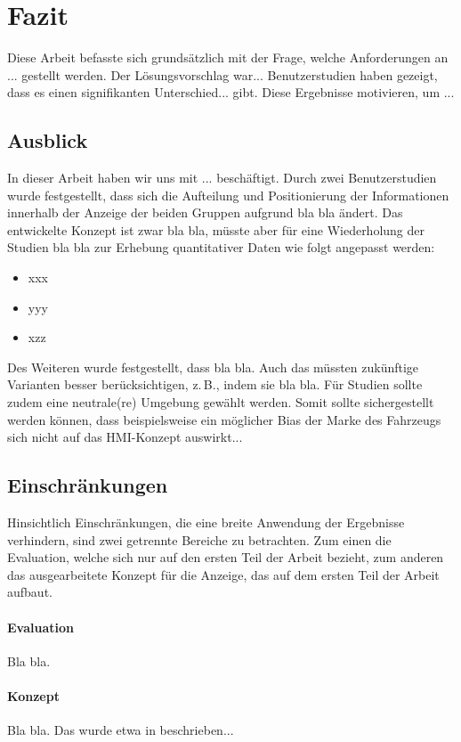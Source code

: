\section{Fazit}
Diese Arbeit befasste sich grundsätzlich mit der Frage, welche Anforderungen an ... gestellt werden.
Der Lösungsvorschlag war...
Benutzerstudien haben gezeigt, dass es einen signifikanten Unterschied... gibt. Diese Ergebnisse motivieren, um ...

\subsection{Ausblick} 
In dieser Arbeit haben wir uns mit ... beschäftigt. Durch zwei Benutzerstudien wurde festgestellt, dass sich die Aufteilung und Positionierung der Informationen innerhalb der Anzeige der beiden Gruppen aufgrund bla bla ändert. Das entwickelte Konzept ist zwar bla bla, müsste aber für eine Wiederholung der Studien bla bla zur Erhebung quantitativer Daten wie folgt angepasst werden:

\begin{itemize}
\item xxx
\item yyy
\item xzz
\end{itemize}

Des Weiteren wurde festgestellt, dass bla bla. Auch das müssten zukünftige Varianten besser berücksichtigen, z.\,B., indem sie bla bla. Für Studien sollte zudem eine neutrale(re) Umgebung gewählt werden. Somit sollte sichergestellt werden können, dass beispielsweise ein möglicher Bias der Marke des Fahrzeugs sich nicht auf das HMI-Konzept auswirkt...

\subsection{Einschränkungen}
Hinsichtlich Einschränkungen, die eine breite Anwendung der Ergebnisse verhindern, sind zwei getrennte Bereiche zu betrachten. Zum einen die Evaluation, welche sich nur auf den ersten Teil der Arbeit bezieht, zum anderen das ausgearbeitete Konzept für die Anzeige, das auf dem ersten Teil der Arbeit aufbaut. \\ [-2.5em]

\paragraph{Evaluation} 
Bla bla.

\paragraph{Konzept}
Bla bla. Das wurde etwa in beschrieben...

